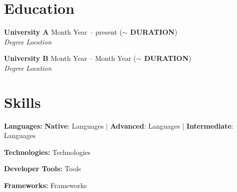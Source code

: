 \documentclass[a4paper,10pt]{article}
\newcommand{\entry}[4]{
  \noindent\textbf{#1} \hfill #2 \\
  \noindent\textit{#3} \hfill \textit{#4} \\
  \vspace{2pt}
}
\begin{document}
\section*{Education}
\vspace{0.6em}
\entry{University A}{\faCalendar \space Month Year -- present (\textbf{$\sim$ DURATION})}{Degree}{\faMapMarker \space Location}

\vspace{-0.6em}

\entry{University B}{\faCalendar \space Month Year -- Month Year (\textbf{$\sim$ DURATION})}{Degree}{\faMapMarker \space Location}

\section*{Skills}
\vspace{0.6em}
\item \textbf{Languages:} \textbf{Native}: Languages | \textbf{Advanced}: Languages | \textbf{Intermediate}: Languages
\item \textbf{Technologies:} Technologies
\item \textbf{Developer Tools:} Tools
\item \textbf{Frameworks:} Frameworks
\end{document}
